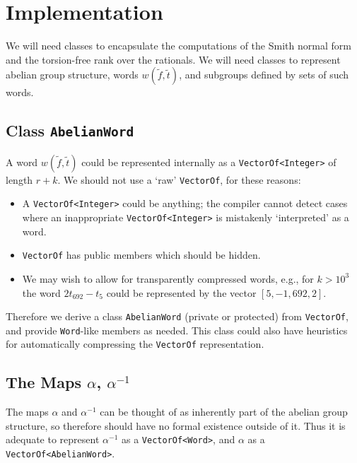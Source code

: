 \section{Implementation}

We will need classes to encapsulate the computations of the Smith
normal form and the torsion-free rank over the rationals. We will need
classes to represent abelian group structure, words
$w(\tilde{f},\tilde{t})$, and subgroups defined by sets of such words.

\subsection{Class {\tt AbelianWord}}

A word $w(\tilde{f},\tilde{t})$ could be represented internally as a
{\tt VectorOf<Integer>} of length $r+k$. We should not use a `raw'
{\tt VectorOf}, for these reasons:

\begin{itemize}

\item
A {\tt VectorOf<Integer>} could be anything; the compiler cannot
detect cases where an inappropriate {\tt VectorOf<Integer>} is
mistakenly `interpreted' as a word.

\item
{\tt VectorOf} has public members which should be hidden.

\item
We may wish to allow for transparently compressed words, e.g., for
$k>10^3$ the word $2t_{692}-t_5$ could be represented by the vector
$[5,-1,692,2]$.

\end{itemize}

Therefore we derive a class {\tt AbelianWord} (private or protected)
from {\tt VectorOf}, and provide {\tt Word}-like members as
needed. This class could also have heuristics for automatically
compressing the {\tt VectorOf} representation.


\subsection{The Maps $\alpha$, $\alpha^{-1}$}

The maps $\alpha$ and $\alpha^{-1}$ can be thought of as inherently
part of the abelian group structure, so therefore should have no
formal existence outside of it. Thus it is adequate to represent
$\alpha^{-1}$ as a {\tt VectorOf<Word>}, and $\alpha$ as a {\tt
VectorOf<AbelianWord>}.



